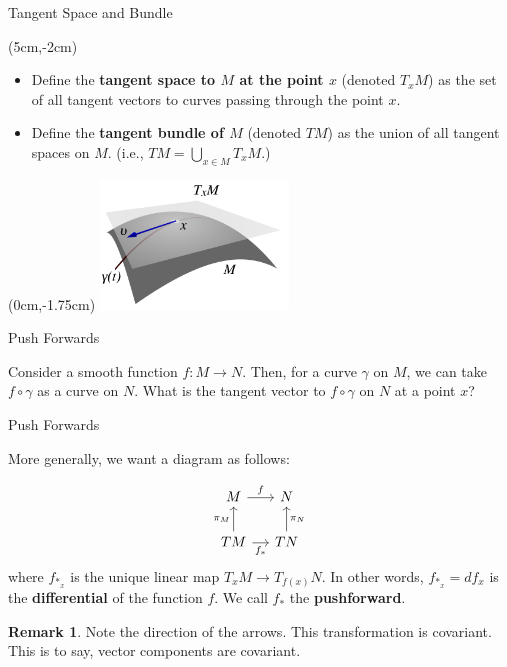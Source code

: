 \documentclass[usenames,dvipsnames]{beamer}
\theoremstyle{definition}
\newtheorem*{remark}{Remark}
\theoremstyle{theorem}
\begin{document}
        \begin{frame}{Tangent Space and Bundle}
            \begin{textblock*}{6cm}(5cm,-2cm)
            \begin{itemize}
                \item Define the \textbf{tangent space to $M$ at the point $x$} (denoted $T_xM$) as the set of all tangent vectors to curves passing through the point $x$.
                \item Define the \textbf{tangent bundle of $M$} (denoted $TM$) as the union of all tangent spaces on $M$. (i.e., $TM=\bigcup_{x\in M}T_xM$.)
            \end{itemize}
            \end{textblock*}
            \begin{textblock*}{5cm}(0cm,-1.75cm)
            \includegraphics[width=5cm]{Riemannian_Geometry/tangent_space.png}
            \end{textblock*}
        \end{frame}


        \begin{frame}{Push Forwards}
            \begin{paragraph}
                Consider a smooth function $f\colon M \to N$.  Then, for a curve $\gamma$ on $M$, we can take $f\circ \gamma$ as a curve on $N$.  What is the tangent vector to $f\circ \gamma$ on $N$ at a point $x$?
            \end{paragraph}
        \end{frame}
        
        \begin{frame}{Push Forwards}
            \begin{paragraph}
                More generally, we want a diagram as follows:
            \end{paragraph}
            \[
            \begin{tikzcd}[ampersand replacement = \&, column sep=small]
            M \arrow[r, "f"] \& N \\
            TM \arrow[r, "f_*"'] \arrow[u, "\pi_M"] \& TN \arrow[u, "\pi_N"']
            \end{tikzcd}
            \]
            where $f_{*_x}$ is the unique linear map $T_xM \to T_{f(x)}N$.  In other words, $f_{*_x}=df_x$ is the \textbf{differential} of the function $f$. We call $f_*$ the \textbf{pushforward}.
            \begin{remark}
                Note the direction of the arrows. This transformation is covariant. This is to say, vector components are covariant.
            \end{remark}
        \end{frame}
        
\end{document}
